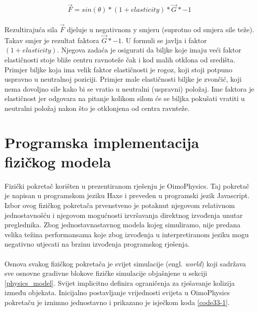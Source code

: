 \documentclass[times, utf8, diplomski]{fer}
\begin{document}
\begin{equation}
\vec{F} = sin(\theta) * (1 + elasticity) * \vec{G} * -1
\label{eq:32-2}
\end{equation}

\paragraph{}
Rezultirajuća sila $\vec{F}$ djeluje u negativnom y smjeru (suprotno od smjera sile teže).
Takav smjer je rezultat faktora $\vec{G} * -1$. U formuli se javlja i faktor $(1 + 
elasticity)$. Njegova zadaća je osigurati da biljke koje imaju veći faktor elastičnosti 
stoje bliže centru ravnoteže čak i kod malih otklona od središta. Primjer biljke koja ima 
velik faktor elastičnosti je rogoz, koji stoji potpuno uspravno u neutralnoj poziciji. 
Primjer male elastičnosti biljke je zvončić, koji nema dovoljno sile kako bi se vratio u 
neutralni (uspravni) položaj. Ime faktora je elastičnost jer odgovara na pitanje kolikom 
silom će se biljka pokušati vratiti u neutralni položaj nakon što je otklonjena od centra 
ravnteže.

\section{Programska implementacija fizičkog modela}
\paragraph{}
Fizički pokretač korišten u prezentiranom rješenju je OimoPhysics. Taj pokretač je napisan
u programskom jeziku Haxe i preveden u programski jezik Javascript. Izbor ovog fizičkog 
pokretača prvenstveno je potaknut njegovom relativnom jednostavnošću i njegovom mogućnosti 
izvršavanja direktnog izvođenja unutar preglednika. Zbog jednostavnastavnog modela kojeg 
simuliramo, nije predana velika težina performansama koje zbog izvođenja u interpretiranom
jeziku mogu negativno utjecati na brzinu izvođenja programskog rješenja.

\paragraph{}
Osnova svakog fizičkog pokretača je svijet simulacije (engl. \textit{world}) koji sadržava 
sve osnovne gradivne blokove fizičke simulacije objašnjene u sekciji \ref{physics_model}.
Svijet implicitno definira ograničenja za rješavanje kolizija između objekata. Inicijalno
postavljanje vrijednosti svijeta u OimoPhysics pokretaču je iznimno jednostavno i prikazano je isječkom koda \ref{code33-1}.
\end{document}
